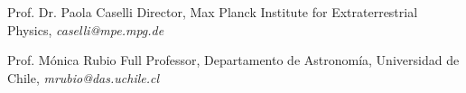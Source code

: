 

\begin{cvhonors}
	\cvhonor
	{Prof. Dr. Paola Caselli} %
	{Director, Max Planck Institute for Extraterrestrial Physics, \textit{caselli@mpe.mpg.de}} %
	{} %
	{} %
	
	\cvhonor
	{Prof. M\'onica Rubio} %
	{Full Professor, Departamento de Astronom\'ia, Universidad de Chile, \textit{mrubio@das.uchile.cl}} %
	{} %
	{} %
	
	
\end{cvhonors}